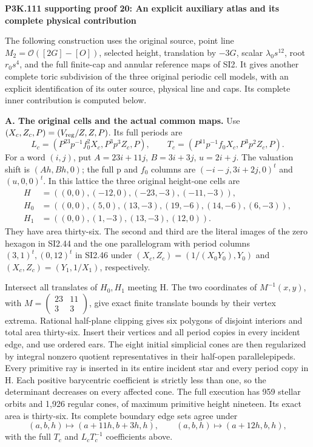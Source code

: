\par\bigskip\noindent\textbf{P3K.111 supporting proof 20: An explicit auxiliary atlas and its complete physical contribution}\par\nobreak

The following construction uses the original source, point line
\(M_2=\mathcal O([2G]-[O])\), selected height, translation by \(-3G\),
scalar \(\lambda_0s^{12}\), root \(r_0s^4\), and the full finite-cap and
annular reference maps of SI2.  It gives another complete toric subdivision
of the three original periodic cell models, with an explicit identification
of its outer source, physical line and caps.  Its complete inner contribution
is computed below.

\medskip\noindent\textbf{A. The original cells and the actual common maps.}
Use \((X_c,Z_c,P)=(V_{\rm reg}/Z,Z,P)\).  Its full periods are
\[
 L_c=(P^{23}p^{-1}f_0^2X_c,P^3p^3Z_c,P),\qquad
 T_c=(P^{11}p^{-1}f_0X_c,P^3p^2Z_c,P).
\]
For a word \((i,j)\), put \(A=23i+11j\), \(B=3i+3j\),
\(u=2i+j\).  The valuation shift is \((Ah,Bh,0)\); the full p and
\(f_0\) columns are \((-i-j,3i+2j,0)^t\) and \((u,0,0)^t\).
In this lattice the three original height-one cells are
\[
\begin{split}
H&=((0,0),(-12,0),(-23,-3),(-11,-3)),\\
H_0&=((0,0),(5,0),(13,-3),(19,-6),(14,-6),(6,-3)),\\
H_1&=((0,0),(1,-3),(13,-3),(12,0)).
\end{split}
\]
They have area thirty-six.  The second and third are the literal images of
the zero hexagon in SI2.44 and the one parallelogram with period columns
\((3,1)^t,(0,12)^t\) in SI2.46 under
\((X_c,Z_c)=(1/(X_0Y_0),Y_0)\) and
\((X_c,Z_c)=(Y_1,1/X_1)\), respectively.

Intersect all translates of \(H_0,H_1\) meeting H.  The two coordinates of
\(M^{-1}(x,y)\), with
\(M=\left(\begin{smallmatrix}23&11\\3&3\end{smallmatrix}\right)\),
give exact finite translate bounds
by their vertex extrema.  Rational half-plane clipping gives six polygons
of disjoint interiors and total area thirty-six.  Insert their vertices and
all period copies in every incident edge, and use ordered ears.  The eight
initial simplicial cones are then regularized by integral nonzero quotient
representatives in their half-open parallelepipeds.  Every primitive ray is
inserted in its entire incident star and every period copy in H.  Each
positive barycentric coefficient is strictly less than one, so the
determinant decreases on every affected cone.  The full execution has 959
stellar orbits and 1,926 regular cones, of maximum primitive height nineteen.
Its exact area is thirty-six.  Its complete boundary edge sets agree under
\[
(a,b,h)\mapsto(a+11h,b+3h,h),\qquad
(a,b,h)\mapsto(a+12h,b,h),
\]
with the full \(T_c\) and \(L_cT_c^{-1}\) coefficients above.

